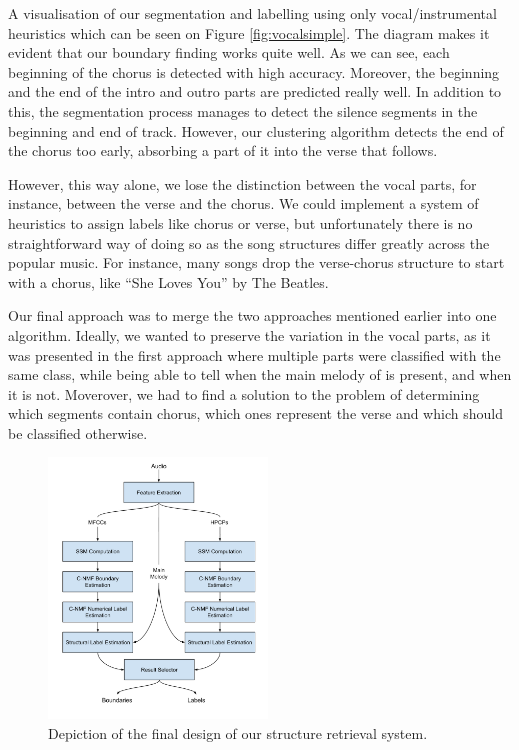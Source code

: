 A visualisation of our segmentation and labelling using only vocal/instrumental heuristics which can be seen on Figure \ref{fig:vocalsimple}. The diagram makes it evident that our boundary finding works quite well. As we can see, each beginning of the chorus is detected with high accuracy. Moreover, the beginning and the end of the intro and outro parts are predicted really well. In addition to this, the segmentation process manages to detect the silence segments in the beginning and end of track. However, our clustering algorithm detects the end of the chorus too early, absorbing a part of it into the verse that follows.

However, this way alone, we lose the distinction between the vocal parts, for instance, between the verse and the chorus. We could implement a system of heuristics to assign labels like chorus or verse, but unfortunately there is no straightforward way of doing so as the song structures differ greatly across the popular music. For instance, many songs drop the verse-chorus structure to start with a chorus, like ``She Loves You'' by The Beatles.

Our final approach was to merge the two approaches mentioned earlier into one algorithm. Ideally, we wanted to preserve the variation in the vocal parts, as it was presented in the first approach where multiple parts were classified with the same class, while being able to tell when the main melody of is present, and when it is not. Moverover, we had to find a solution to the problem of determining which segments contain chorus, which ones represent the verse and which should be classified otherwise.


\begin{figure}
\vspace{-30pt}
  \begin{center}
    \includegraphics[width=0.52\textwidth]{Figures/Structure-Retrieval}
  \end{center}
  \caption{Depiction of the final design of our structure retrieval system.}
\label{fig:NMF}
\end{figure}


